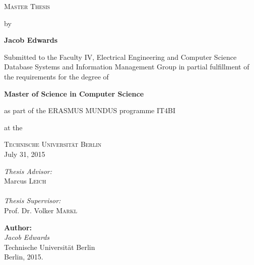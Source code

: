 \documentclass[%
   a4paper,%
  11pt,                    %
  openright,              %
  headsepline,          %
  cleardoubleempty,
  chapterprefix,
  titlepage,%
  liststotoc,%
  bibtotoc,%
  idxtotoc,%
  headinclude,           %
  pointlessnumbers,%
  USenglish
  ]{scrbook}
\theoremstyle{break}
\begin{document}
\begin{titlepage}
\begin{center}
\vspace{1cm}
 
\Large \textsc{Master Thesis}
 
\vspace{0.2cm}
 
by
 
\vspace{0.4cm}
 
 
\textbf{Jacob Edwards}
 
\vspace{1.0cm}
 
\vfill
 
\large 
Submitted to the Faculty IV, Electrical Engineering and Computer Science
Database Systems and Information Management Group
in partial fulfillment of the requirements for the degree of
 
\textbf{Master of Science in Computer Science}
 
as part of the ERASMUS MUNDUS programme IT4BI
 
at the 
 
\textsc{Technische Universit\"{a}t Berlin} \\
 
July 31, 2015
 
\vfill
 
\begin{flushright} 
\normalsize 
\emph{Thesis Advisor:}\\
Marcus \textsc{Leich} \\
 
\ \\
 
\emph{Thesis Supervisor:}\\
Prof. Dr. Volker \textsc{Markl}\\
\end{flushright}
 
 
\end{center}
\end{titlepage}


\vspace*{\fill}
\begin{minipage}{15cm}
\textbf{Author:}\\
\emph{Jacob Edwards}\\Technische Universität Berlin\\
Berlin, 2015.
\end{minipage}
\newpage
\end{document}
